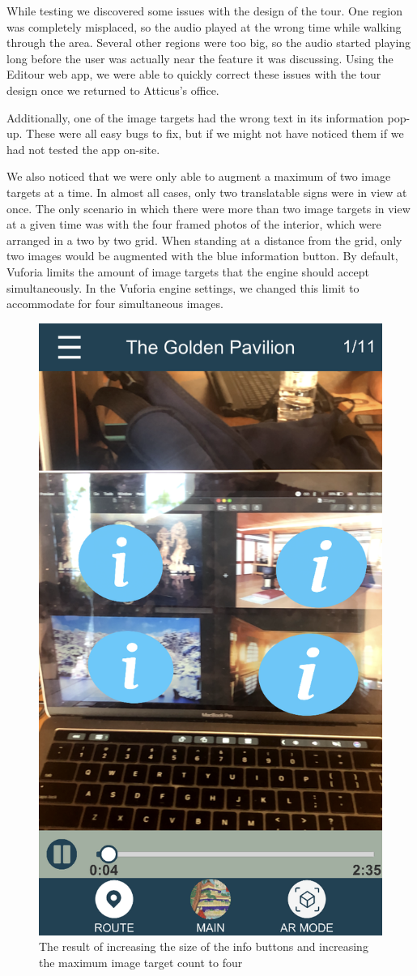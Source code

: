 \documentclass[a4paper, 10pt, american, titlepage]{article}
\begin{document}
While testing we discovered some issues with the design of the tour. One
region was completely misplaced, so the audio played at the wrong time while
walking through the area. Several other regions were too big, so the audio
started playing long before the user was actually near the feature it was
discussing. Using the Editour web app, we were able to quickly correct these
issues with the tour design once we returned to Atticus's office.

Additionally, one of the image targets had the wrong text in its information
pop-up. These were all easy bugs to fix, but if we might not have noticed
them if we had not tested the app on-site.

We also noticed that we were only able to augment a maximum of two image targets
at a time. In almost all cases, only two translatable signs were in view at
once. The only scenario in which there were more than two image targets in view
at a given time was with the four framed photos of the interior, which were
arranged in a two by two grid. When standing at a distance from the grid, only
two images would be augmented with the blue information button. By default,
Vuforia limits the amount of image targets that the engine should accept
simultaneously. In the Vuforia engine settings, we changed this limit to
accommodate for four simultaneous images.

\begin{figure}[h]
	\centering
	\includegraphics[width=.5\textwidth]{four-i-buttons.png}
	\caption{The result of increasing the size of the info buttons and increasing
    the maximum image target count to four}
	\label{fig:fourIButtons}
\end{figure}
\end{document}
